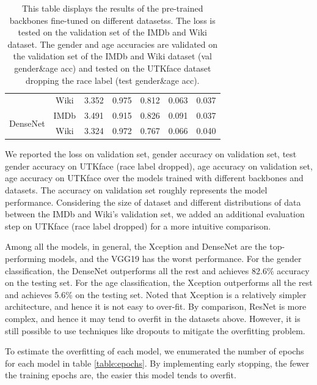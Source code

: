 \documentclass[DIV=calc, paper=a4, fontsize=10pt, twocolumn]{article}
\begin{document}
\begin{table}[t]
\begin{tabular}{ccccccc}
			\multicolumn{1}{c|}{}                                   & \multicolumn{1}{c|}{Wiki} & 3.352 & 0.975          & 0.812           & 0.063       & 0.037        \\ \cline{1-2}
			\multicolumn{1}{c|}{\multirow{2}{*}{DenseNet}}          & \multicolumn{1}{c|}{IMDb} & 3.491 & 0.915          & 0.826           & 0.091       & 0.037        \\ \cline{2-2}
			\multicolumn{1}{c|}{}                                   & \multicolumn{1}{c|}{Wiki} & 3.324 & 0.972          & 0.767           & 0.066       & 0.040        \\ \cline{1-2}
		\end{tabular}
		\caption{This table displays the results of the pre-trained backbones fine-tuned on different datasetss. The loss is tested on the validation set of the IMDb and Wiki dataset. The gender and age accuracies are validated on the validation set of the IMDb and Wiki dataset (val gender\&age acc) and tested on the UTKface dataset dropping the race label (test gender\&age acc).}
		\label{wiki-imdb-table}
	\end{table}

	We reported the loss on validation set, gender accuracy on validation set, test gender accuracy on UTKface (race label dropped), age accuracy on validation set, age accuracy on UTKface over the models trained with different backbones and datasets. The accuracy on validation set roughly represents the model performance. Considering the size of dataset and different distributions of data between the IMDb and Wiki's validation set, we added an additional evaluation step on UTKface (race label dropped) for a more intuitive comparison.
	
	Among all the models, in general, the Xception and DenseNet are the top-performing models, and the VGG19 has the worst performance. For the gender classification, the DenseNet outperforms all the rest and achieves 82.6\% accuracy on the testing set. For the age classification, the Xception outperforms all the rest and achieves 5.6\% on the testing set. Noted that Xception is a relatively simpler architecture, and hence it is not easy to over-fit. By comparison, ResNet is more complex, and hence it may tend to overfit in the datasets above. However, it is still possible to use techniques like dropouts to mitigate the overfitting problem.
	
	To estimate the overfitting of each model, we enumerated the number of epochs for each model in table \ref{table:epochs}. By implementing early stopping, the fewer the training epochs are, the easier this model tends to overfit.
	
\end{document}
